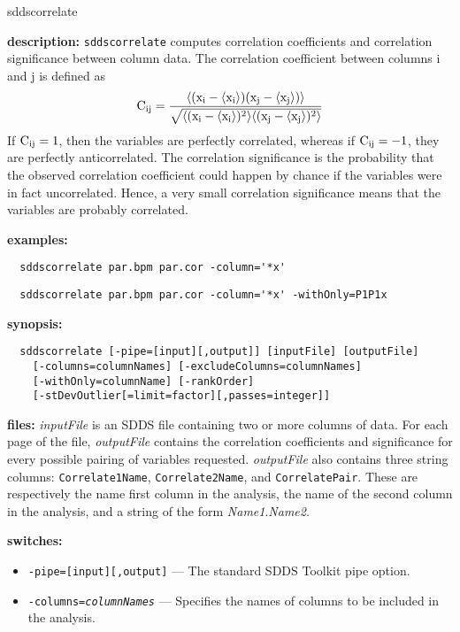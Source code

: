 \begin{sddsprog}{sddscorrelate}
\item \textbf{description:}
  {\tt sddscorrelate} computes correlation coefficients and correlation
  significance between column data. The correlation coefficient between
  columns i and j is defined as
  \[ {\rm C_{ij} = \frac{\langle (x_i-\langle x_i \rangle) (x_j-\langle x_j \rangle)\rangle}
  {\sqrt{\langle (x_i-\langle x_i \rangle)^2\rangle \langle (x_j - \langle x_j \rangle)^2 \rangle}}} \]
  If ${\rm C_{ij}=1}$, then the variables are perfectly correlated, whereas if ${\rm C_{ij}=-1}$,
  they are perfectly anticorrelated. The correlation significance is the probability that the
  observed correlation coefficient could happen by chance if the variables were in fact
  uncorrelated. Hence, a very small correlation significance means that the variables are
  probably correlated.
\item \textbf{examples:}
\begin{verbatim}
  sddscorrelate par.bpm par.cor -column='*x'
\end{verbatim}
\begin{verbatim}
  sddscorrelate par.bpm par.cor -column='*x' -withOnly=P1P1x
\end{verbatim}
\item \textbf{synopsis:}
\begin{verbatim}
  sddscorrelate [-pipe=[input][,output]] [inputFile] [outputFile]
    [-columns=columnNames] [-excludeColumns=columnNames]
    [-withOnly=columnName] [-rankOrder]
    [-stDevOutlier[=limit=factor][,passes=integer]]
\end{verbatim}
\item \textbf{files:}
  {\em inputFile} is an SDDS file containing two or more columns of data. For each page of
  the file, {\em outputFile} contains the correlation coefficients and significance for
  every possible pairing of variables requested. {\em outputFile} also contains three string
  columns: {\tt Correlate1Name}, {\tt Correlate2Name}, and {\tt CorrelatePair}. These are
  respectively the name first column in the analysis, the name of the second column in
  the analysis, and a string of the form {\em Name1}.{\em Name2}.
\item \textbf{switches:}
  \begin{itemize}
  \item {\tt -pipe=[input][,output]} --- The standard SDDS Toolkit pipe option.
  \item {\tt -columns={\em columnNames}} --- Specifies the names of columns to be included in the analysis.

\end{itemize}
\end{sddsprog}
